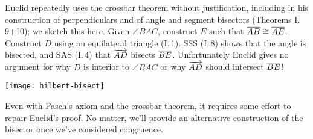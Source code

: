 \begin{minipage}[t]{0.67\linewidth}\vspace{-3pt}
Euclid repeatedly uses the crossbar theorem without justification, including in his construction of perpendiculars and of angle and segment bisectors (Theorems I.\,9+10); we sketch this here.\smallbreak
Given $\angle BAC$, construct $E$ such that $\overline{AB}\cong\overline{AE}$. Construct $D$ using an equilateral triangle (I.\,1). SSS (I.\,8) shows that the angle is bisected, and SAS (I.\,4) that $\overrightarrow{AD}$ bisects $\overline{BE}$.\smallbreak
Unfortunately Euclid gives no argument for why $D$ is interior to $\angle BAC$ or why $\overrightarrow{AD}$ should intersect $\overline{BE}$!
\end{minipage}\hfill\begin{minipage}[t]{0.32\linewidth}\vspace{0pt}
\flushright\texttt{[image: hilbert-bisect]}
\end{minipage}\medbreak


Even with Pasch's axiom and the crossbar theorem, it requires some effort to repair Euclid's proof. No matter, we'll provide an alternative construction of the bisector once we've considered congruence.

\goodbreak

